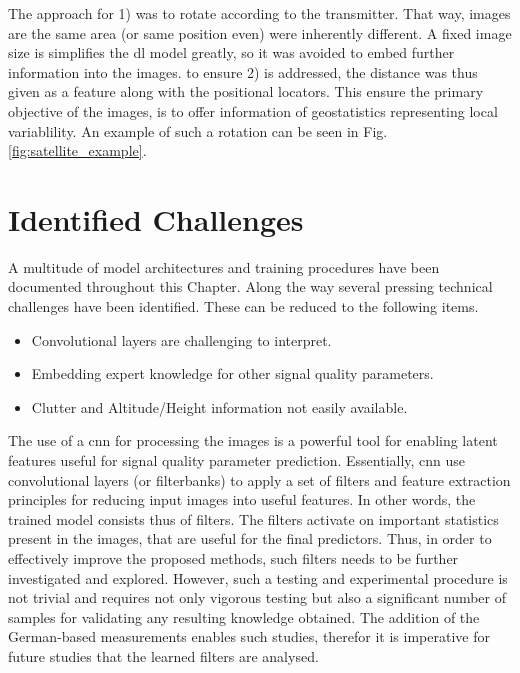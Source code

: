 The approach for 1) was to rotate according to the transmitter. That way, images are the same area (or same position even) were inherently different. A fixed image size is simplifies the \gls{dl} model greatly, so it was avoided to embed further information into the images. to ensure 2) is addressed, the distance was thus given as a feature along with the positional locators. This ensure the primary objective of the images, is to offer information of geostatistics representing local variablility. An example of such a rotation can be seen in Fig. \ref{fig:satellite_example}.











\section{Identified Challenges}\label{sec:identified_challenges_satellite}
A multitude of model architectures and training procedures have been documented throughout this Chapter. Along the way several pressing technical challenges have been identified. These can be reduced to the following items.

\begin{itemize}
    \item Convolutional layers are challenging to interpret.
    \item Embedding expert knowledge for other signal quality parameters.
    \item Clutter and Altitude/Height information not easily available.
\end{itemize}

The use of a \gls{cnn} for processing the images is a powerful tool for enabling latent features useful for signal quality parameter prediction. Essentially, \gls{cnn} use convolutional layers (or filterbanks) to apply a set of filters and feature extraction principles for reducing input images into useful features. In other words, the trained model consists thus of filters. The filters activate on important statistics present in the images, that are useful for the final predictors. Thus, in order to effectively improve the proposed methods, such filters needs to be further investigated and explored. However, such a testing and experimental procedure is not trivial and requires not only vigorous testing but also a significant number of samples for validating any resulting knowledge obtained. The addition of the German-based measurements enables such studies, therefor it is imperative for future studies that the learned filters are analysed.


